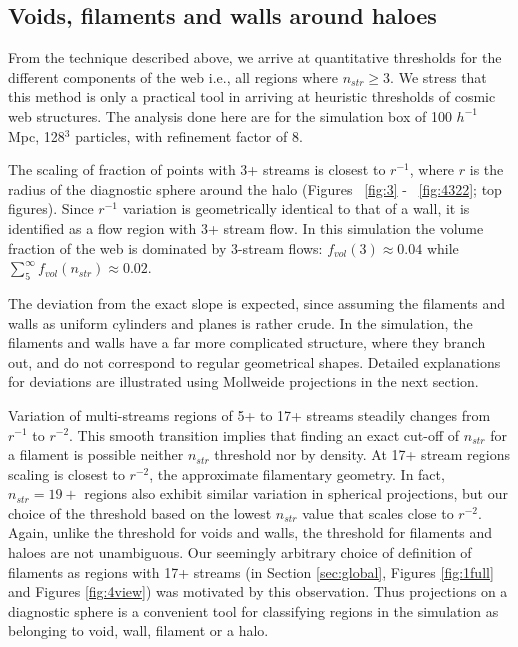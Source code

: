 \subsection{Voids, filaments and walls around haloes}

From the technique described  above, we arrive at quantitative thresholds for the different components of the web i.e., all regions where
$n_{str} \ge 3$. We stress that this method is only a practical tool in arriving at heuristic thresholds of cosmic web structures. The analysis done here are for the simulation box of 100 $h^{-1}$ Mpc, 128$^3$ particles, with refinement factor of 8.

The scaling of fraction of points with 3+ streams is closest to $r^{-1}$, where $r$ is the radius of the diagnostic sphere around the halo (Figures ~\ref{fig:3} - ~\ref{fig:4322}; top figures). Since $r^{-1}$ variation is geometrically identical to that of a wall, it is identified as a flow region with 3+ stream flow. In this simulation the volume fraction of the web is dominated by 3-stream flows: $f_{vol}(3) \approx 0.04$ while
$\sum_5^{\infty} f_{vol}(n_{str}) \approx 0.02$.  

The deviation from the exact slope is expected, since assuming the filaments and walls as uniform cylinders 
and planes is rather crude. In the simulation, the filaments and walls have a far more complicated structure, where they branch out, and do not correspond to regular geometrical shapes. Detailed explanations for deviations are illustrated using Mollweide projections in the next section. 

Variation of multi-streams regions of 5+ to 17+ streams steadily changes from $r^{-1}$ to $r^{-2}$. This smooth transition implies that finding an exact cut-off of $n_{str}$ for  a filament is possible neither $n_{str}$ threshold nor by density. At 17+ stream regions scaling is closest to $r^{-2}$, the approximate filamentary geometry. In fact, $n_{str} = 19+$ regions also exhibit similar variation in spherical projections, but our choice of the threshold based on the lowest $n_{str}$ value that scales close to $r^{-2}$. Again, unlike the threshold for voids and walls, the threshold for filaments and haloes are not unambiguous. Our seemingly arbitrary choice of definition of filaments as regions with 17+ streams (in Section \ref{sec:global}, Figures \ref{fig:1full} and Figures \ref{fig:4view}) was motivated by this observation. 
Thus projections on a diagnostic sphere is a convenient tool for classifying regions in the simulation as belonging to void, wall, filament or a halo. 

